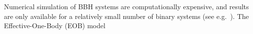 % 
% 
% 
Numerical simulation of BBH systems are computationally expensive, and results
are only available for a relatively small number of binary systems (see
e.g.~\cite{Ajith:2012tt}).  The Effective-One-Body (EOB) model~\cite{EOBOriginalBuonannoDamour}

